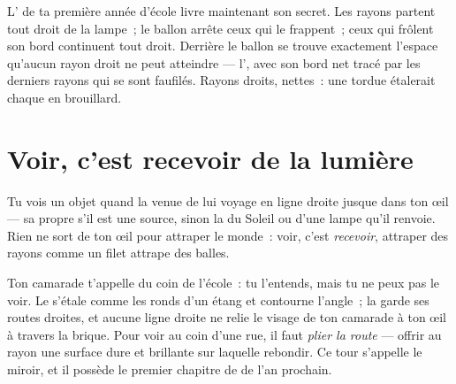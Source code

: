 \begin{example}\label{ex:g4:light-straight-lines:shadows}
L' de ta première année d'école livre maintenant son secret. Les
rayons partent tout droit de la lampe~; le ballon arrête ceux qui le
frappent~; ceux qui frôlent son bord continuent tout droit. Derrière
le ballon se trouve exactement l'espace qu'aucun rayon droit ne peut
atteindre --- l', avec son bord net tracé par les derniers
rayons qui se sont faufilés. Rayons droits,  nettes~: une
 tordue étalerait chaque  en brouillard.
\end{example}

\section{Voir, c'est recevoir de la lumière}

\begin{proposition}\label{prop:g4:light-straight-lines:seeing}
Tu vois un objet quand la  venue de lui voyage en ligne droite
jusque dans ton œil --- sa propre  s'il est une source, sinon
la  du Soleil ou d'une lampe qu'il renvoie. Rien ne sort de
ton œil pour attraper le monde~: voir, c'est \emph{recevoir},
attraper des rayons comme un filet attrape des balles.
\end{proposition}

\begin{example}\label{ex:g4:light-straight-lines:corner}
Ton camarade t'appelle du coin de l'école~: tu l'entends, mais tu ne
peux pas le voir. Le  s'étale comme les ronds d'un étang et
contourne l'angle~; la  garde ses routes droites, et aucune
ligne droite ne relie le visage de ton camarade à ton œil à travers
la brique. Pour voir au coin d'une rue, il faut \emph{plier la
route} --- offrir au rayon une surface dure et brillante sur laquelle
rebondir. Ce tour s'appelle le miroir, et il possède le premier
chapitre de  de l'an prochain.
\end{example}

